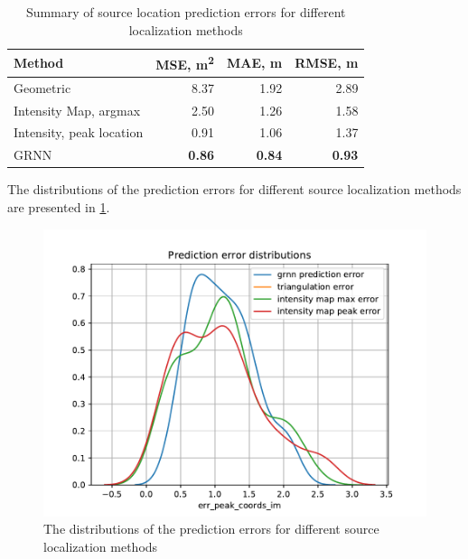 \documentclass[applsci,article,submit,moreauthors,pdftex]{Definitions/mdpi}
\begin{document}

\begin{table}
	\centering
	\caption{Summary of source location prediction errors for different localization methods}\label{table:methodsprederr}
	\begin{tabular}{lrrr}
		\toprule
		Method &       MSE, \si{\meter\squared} &       MAE, m &      RMSE, m \\\toprule
		Geometric &  8.37 &  1.92 &  2.89 \\\midrule
		Intensity Map, argmax &  2.50 &  1.26 &  1.58 \\\midrule
		Intensity, peak location &  0.91 &  1.06 &  1.37 \\\midrule
		GRNN &  \textbf{0.86} &  \textbf{0.84} &  \textbf{0.93} \\\bottomrule
	\end{tabular}
\end{table}

The distributions of the prediction errors for different source localization methods are presented in \figurename{} \ref{fig:1prederrdistribution}.

\begin{figure}
	\centering
	\includegraphics[width=0.5\linewidth]{img/from_diser/1pred_err_distribution}
	\caption{The distributions of the prediction errors for different source localization methods}
	\label{fig:1prederrdistribution}
\end{figure}
\end{document}

